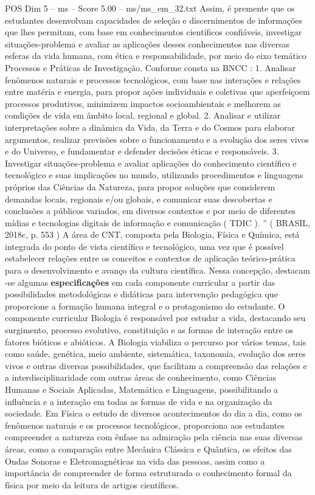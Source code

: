 \begin{textsample}{POS Dim 5 – ms – Score 5.00 – ms/ms\_em\_32.txt}
Assim, é premente que os estudantes desenvolvam capacidades de seleção e discernimentos de informações que lhes permitam, com base em conhecimentos científicos confiáveis, investigar situações-problema e avaliar as aplicações desses conhecimentos nas diversas esferas da vida humana, com ética e responsabilidade, por meio do eixo temático Processos e Práticas de Investigação.
Conforme consta na BNCC : 1.
Analisar fenômenos naturais e processos tecnológicos, com base nas interações e relações entre matéria e energia, para propor ações individuais e coletivas que aperfeiçoem processos produtivos, minimizem impactos socioambientais e melhorem as condições de vida em âmbito local, regional e global. 2.
Analisar e utilizar interpretações sobre a dinâmica da Vida, da Terra e do Cosmos para elaborar argumentos, realizar previsões sobre o funcionamento e a evolução dos seres vivos e do Universo, e fundamentar e defender decisões éticas e responsáveis. 3.
Investigar situações-problema e avaliar aplicações do conhecimento científico e tecnológico e suas implicações no mundo, utilizando procedimentos e linguagens próprios das Ciências da Natureza, para propor soluções que considerem demandas locais, regionais e/ou globais, e comunicar suas descobertas e conclusões a públicos variados, em diversos contextos e por meio de diferentes mídias e tecnologias digitais de informação e comunicação ( TDIC ). ” ( BRASIL, 2018c, p. 553 ) A área de CNT, composta pela Biologia, Física e Química, está integrada do ponto de vista científico e tecnológico, uma vez que é possível estabelecer relações entre os conceitos e contextos de aplicação teórico-prática para o desenvolvimento e avanço da cultura científica.
Nessa concepção, destacam -se algumas \textbf{especificações} em cada componente curricular a partir das possibilidades metodológicas e didáticas para intervenção pedagógica que proporcione a formação humana integral e o protagonismo do estudante.
O componente curricular Biologia é responsável por estudar a vida, destacando seu surgimento, processo evolutivo, constituição e as formas de interação entre os fatores bióticos e abióticos.
A Biologia viabiliza o percurso por vários temas, tais como saúde, genética, meio ambiente, sistemática, taxonomia, evolução dos seres vivos e outras diversas possibilidades, que facilitam a compreensão das relações e a interdisciplinaridade com outras áreas de conhecimento, como Ciências Humanas e Sociais Aplicadas, Matemática e Linguagens, possibilitando a influência e a interação em todas as formas de vida e na organização da sociedade.
Em Física o estudo de diversos acontecimentos do dia a dia, como os fenômenos naturais e os processos tecnológicos, proporciona aos estudantes compreender a natureza com ênfase na admiração pela ciência nas suas diversas áreas, como a comparação entre Mecânica Clássica e Quântica, os efeitos das Ondas Sonoras e Eletromagnéticas na vida das pessoas, assim como a importância de compreender de forma estruturada o conhecimento formal da física por meio da leitura de artigos científicos.

\end{textsample}
